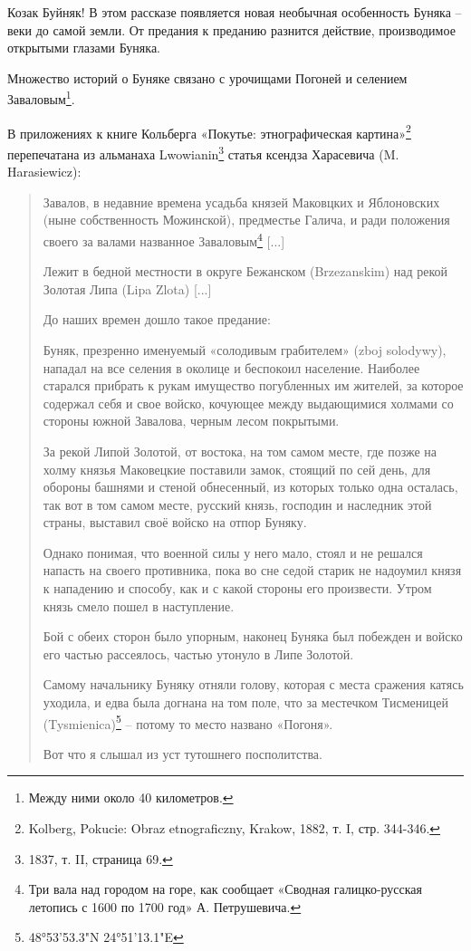 Козак Буйняк! В этом рассказе появляется новая необычная особенность Буняка – веки до самой земли. От предания к преданию разнится действие, производимое открытыми глазами Буняка.

Множество историй о Буняке связано с урочищами Погоней и селением Заваловым\footnote{Между ними около 40 километров.}.

В приложениях к книге Кольберга «Покутье: этнографическая картина»\footnote{Kolberg, Pokucie: Obraz etnograficzny, Krakow, 1882, т. I, стр. 344-346.} перепечатана из альманаха Lwowianin\footnote{1837, т. II, страница 69.}  статья ксендза Харасевича (M. Harasiewicz):

\begin{quotation}
Завалов, в недавние времена усадьба князей Маковцких и Яблоновских (ныне собственность Можинской), предместье Галича, и ради положения своего за валами названное Заваловым\footnote{Три вала над городом на горе, как сообщает «Сводная галицко-русская летопись с 1600 по 1700 год» А. Петрушевича.} [...]

Лежит в бедной местности в округе Бежанском (Brzezanskim) над рекой Золотая Липа (Lipa Zlota) [...]

До наших времен дошло такое предание:

Буняк, презренно именуемый «солодивым грабителем» (zboj solodywy), нападал на все селения в околице и беспокоил население. Наиболее старался прибрать к рукам имущество погубленных им жителей, за которое содержал себя и свое войско, кочующее между выдающимися холмами со стороны южной Завалова, черным лесом покрытыми.

За рекой Липой Золотой, от востока, на том самом месте, где позже на холму князья Маковецкие поставили замок, стоящий по сей день, для обороны башнями и стеной обнесенный, из которых только одна осталась, так вот в том самом месте, русский князь, господин и наследник этой страны, выставил своё войско на отпор Буняку.

Однако понимая, что военной силы у него мало, стоял и не решался напасть на своего противника, пока во сне седой старик не надоумил князя к нападению и способу, как и с какой стороны его произвести. Утром князь смело пошел в наступление. 

Бой с обеих сторон было упорным, наконец Буняка был побежден и войско его частью рассеялось, частью утонуло в Липе Золотой.

Самому начальнику Буняку отняли голову, которая с места сражения катясь уходила, и едва была догнана на том поле, что за местечком Тисменицей (Tysmienica)\footnote{48°53'53.3"N 24°51'13.1"E} – потому то место названо «Погоня».

Вот что я слышал из уст тутошнего посполитства. 
\end{quotation}

